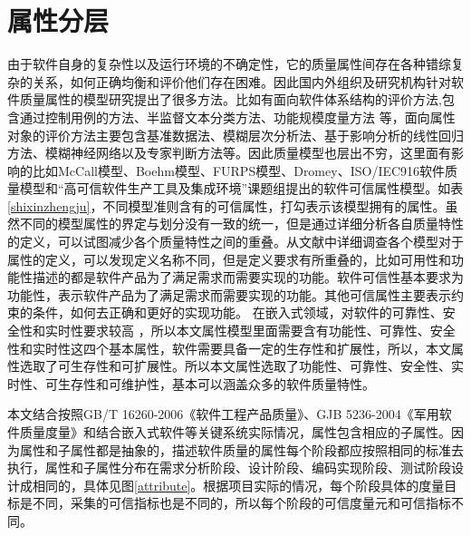 \section{属性分层}
由于软件自身的复杂性以及运行环境的不确定性，它的质量属性间存在各种错综复杂的关系，如何正确均衡和评价他们存在困难。因此国内外组织及研究机构针对软件质量属性的模型研究提出了很多方法。比如有面向软件体系结构的评价方法,包含通过控制用例的方法\cite{Pavlovski2009Non}、半监督文本分类方法\cite{Casamayor2010Identification}、功能规模度量方法\cite{Rajski2002Embedded}
等，面向属性对象的评价方法主要包含基准数据法\cite{Yoji2014The}、模糊层次分析法\cite{Chang2009Applying}、基于影响分析的线性回归方法\cite{Liu1996An}、模糊神经网络\cite{Liao2006Method}以及专家判断方法\cite{王小艺2008一种基于专家知识的软件质量多属性评价方法}等。因此质量模型也层出不穷，这里面有影响的比如McCall模型\cite{Mccall1977Factors}、Boehm模型\cite{Boehm1976Quantitative}、FURPS模型\cite{Grady1987Software}、Dromey\cite{Oliver1995SAFE}、ISO/IEC916软件质量模型\cite{Jung2004Measuring}和“高可信软件生产工具及集成环境”课题组提出的软件可信属性模型\cite{Yin2011Construction}。如表\ref{shixinzhengju}，不同模型准则含有的可信属性，打勾表示该模型拥有的属性。虽然不同的模型属性的界定与划分没有一致的统一，但是通过详细分析各自质量特性的定义，可以试图减少各个质量特性之间的重叠。从文献中详细调查各个模型对于属性的定义，可以发现定义名称不同，但是定义要求有所重叠的，比如可用性和功能性描述的都是软件产品为了满足需求而需要实现的功能。软件可信性基本要求为功能性，表示软件产品为了满足需求而需要实现的功能。其他可信属性主要表示约束的条件，如何去正确和更好的实现功能。
在嵌入式领域，对软件的可靠性、安全性和实时性要求较高 ，所以本文属性模型里面需要含有功能性、可靠性、安全性和实时性这四个基本属性，软件需要具备一定的生存性和扩展性，所以，本文属性选取了可生存性和可扩展性。所以本文属性选取了功能性、可靠性、安全性、实时性、可生存性和可维护性，基本可以涵盖众多的软件质量特性。

本文结合按照GB/T 16260-2006《软件工程产品质量》、GJB 5236-2004《军用软件质量度量》和结合嵌入式软件等关键系统实际情况，属性包含相应的子属性。因为属性和子属性都是抽象的，描述软件质量的属性每个阶段都应按照相同的标准去执行，属性和子属性分布在需求分析阶段、设计阶段、编码实现阶段、测试阶段设计成相同的，具体见图\ref{attribute}。根据项目实际的情况，每个阶段具体的度量目标是不同，采集的可信指标也是不同的，所以每个阶段的可信度量元和可信指标不同。


